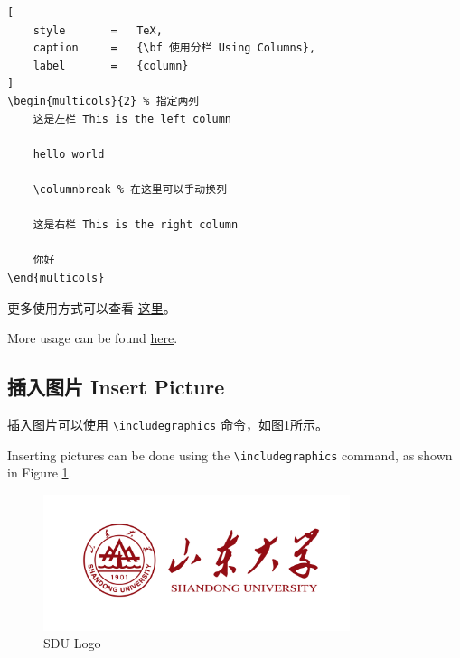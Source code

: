 \documentclass{article}
\begin{document}
\begin{lstlisting}[
    style       =   TeX,
    caption     =   {\bf 使用分栏 Using Columns},
    label       =   {column}
]
\begin{multicols}{2} % 指定两列
    这是左栏 This is the left column

    hello world

    \columnbreak % 在这里可以手动换列

    这是右栏 This is the right column

    你好
\end{multicols}
\end{lstlisting}

更多使用方式可以查看 \href{https://www.overleaf.com/learn/latex/Multiple_columns}{这里}。

More usage can be found \href{https://www.overleaf.com/learn/latex/Multiple_columns}{here}.


\subsection{插入图片 Insert Picture}

插入图片可以使用 \verb|\includegraphics| 命令，如图\ref{fig:1}所示。

Inserting pictures can be done using the \verb|\includegraphics| command, as shown in Figure \ref{fig:1}.

\clearpage

\begin{figure}[htbp]
    \begin{center}
        \includegraphics[width=0.8\textwidth]{imgs/logo1.jpg}
        \caption{SDU Logo}
        \label{fig:1}
    \end{center}
\end{figure}
\end{document}

